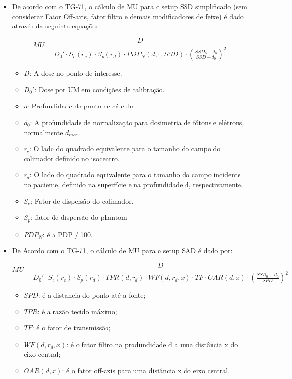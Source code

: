 \documentclass[11pt,a4paper]{article}
\newcounter{exemplo}
\begin{document}
\begin{exemplo}
\begin{itemize}
        \item De acordo com o TG-71, o cálculo de MU para o setup SSD simplificado (sem considerar Fator Off-axis, fator filtro e demais modificadores de feixe) é dado através da seguinte equação:
        
            $$MU = \frac{D}{D_0' \cdot S_c(r_c) \cdot S_p(r_{d}) \cdot PDP_N(d, r, SSD) \cdot \left(\frac{SSD_0 + d_0}{SSD + d_0}\right)^2}$$

            \begin{itemize}[label=\textopenbullet]
                \item $D$: A dose no ponto de interesse.
                \item $D_0'$: Dose por UM em condições de calibração.
                \item $d$: Profundidade do ponto de cálculo.
                \item $d_0$: A profundidade de normalização para dosimetria de fótons e elétrons, normalmente $d_{max}$.
                \item $r_c$: O lado do quadrado equivalente para o tamanho do campo do colimador definido no isocentro.
                \item $r_d$: O lado do quadrado equivalente para o tamanho do campo incidente no paciente, definido na superfície e na profundidade d, respectivamente.
                \item $S_c$: Fator de dispersão do colimador.
                \item $S_p$: fator de dispersão do phantom 
                \item $PDP_N$: é a PDP / 100.
            \end{itemize}

        \item De Acordo com o TG-71, o cálculo de MU para o setup SAD é dado por:
        
            $$MU = \frac{D}{D_0' \cdot S_c(r_c) \cdot S_p(r_{d}) \cdot TPR(d, r_d) \cdot WF(d, r_d, x) \cdot TF \cdot OAR(d, x) \cdot \left(\frac{SSD_0 + d_0}{SPD}\right)^2}$$

            \begin{itemize}[label=\textopenbullet]
                \item $SPD$: é a distancia do ponto até a fonte;
                \item $TPR$: é a razão tecido máximo;
                \item $TF$: é o fator de transmissão;
                \item $WF(d, r_d, x)$: é o fator filtro na produndidade d a uma distância x do eixo central;
                \item $OAR(d, x)$: é o fator off-axis para uma distância x do eixo central.
            \end{itemize}


\end{itemize}
\end{exemplo}
\end{document}
